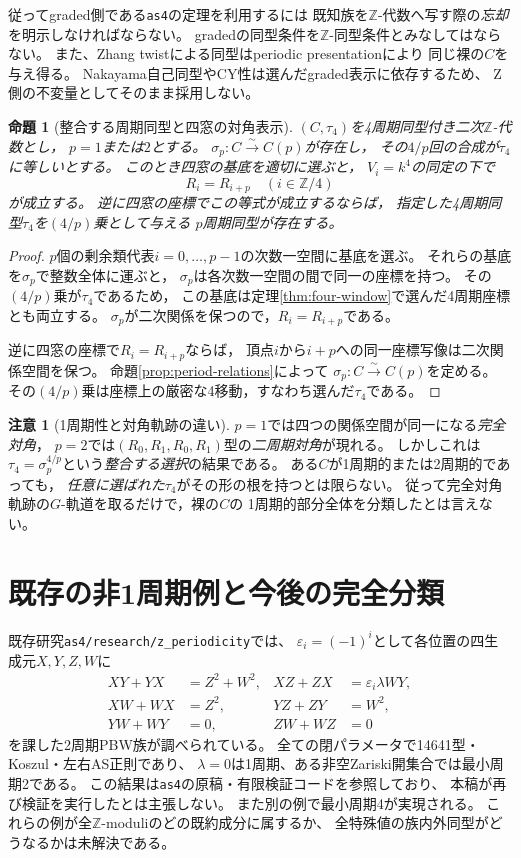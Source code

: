 \documentclass[11pt,a4paper]{ltjsarticle}
\newtheorem{proposition}[theorem]{命題}
\theoremstyle{definition}
\newtheorem{remark}[theorem]{注意}
\newcommand{\ZZ}{\mathbb Z}
\begin{document}
従ってgraded側である\texttt{as4}の定理を利用するには
既知族を$\ZZ$-代数へ写す際の\emph{忘却}を明示しなければならない。
gradedの同型条件を$\ZZ$-同型条件とみなしてはならない。
また、Zhang twistによる同型はperiodic presentationにより
同じ裸の$C$を与え得る。
Nakayama自己同型やCY性は選んだgraded表示に依存するため、
Z側の不変量としてそのまま採用しない。

\begin{proposition}[整合する周期同型と四窓の対角表示]\label{prop:compatible-periodic-windows}
$(C,\tau_4)$を4周期同型付き二次$\mathbb Z$-代数とし，
$p=1$または$2$とする。
$\sigma_p:C\xrightarrow{\sim}C(p)$が存在し，
その$4/p$回の合成が$\tau_4$に等しいとする。
このとき四窓の基底を適切に選ぶと，
$V_i=k^4$の同定の下で
\[
 R_i=R_{i+p}\quad(i\in\mathbb Z/4)
\]
が成立する。
逆に四窓の座標でこの等式が成立するならば，
指定した4周期同型$\tau_4$を$(4/p)$乗として与える
$p$周期同型が存在する。
\end{proposition}
\begin{proof}
$p$個の剰余類代表$i=0,\dots,p-1$の次数一空間に基底を選ぶ。
それらの基底を$\sigma_p$で整数全体に運ぶと，
$\sigma_p$は各次数一空間の間で同一の座標を持つ。
その$(4/p)$乗が$\tau_4$であるため，
この基底は定理\ref{thm:four-window}で選んだ4周期座標とも両立する。
$\sigma_p$が二次関係を保つので，$R_i=R_{i+p}$である。

逆に四窓の座標で$R_i=R_{i+p}$ならば，
頂点$i$から$i+p$への同一座標写像は二次関係空間を保つ。
命題\ref{prop:period-relations}によって
$\sigma_p:C\xrightarrow{\sim}C(p)$を定める。
その$(4/p)$乗は座標上の厳密な4移動，すなわち選んだ$\tau_4$である。
\end{proof}

\begin{remark}[1周期性と対角軌跡の違い]
$p=1$では四つの関係空間が同一になる\emph{完全対角}，
$p=2$では$(R_0,R_1,R_0,R_1)$型の\emph{二周期対角}が現れる。
しかしこれは$\tau_4=\sigma_p^{4/p}$という\emph{整合する選択}の結果である。
ある$C$が1周期的または2周期的であっても，
\emph{任意に選ばれた}$\tau_4$がその形の根を持つとは限らない。
従って完全対角軌跡の$G$-軌道を取るだけで，裸の$C$の
1周期的部分全体を分類したとは言えない。
\end{remark}

\section{既存の非1周期例と今後の完全分類}
既存研究\texttt{as4/research/z\_periodicity}では、
$\varepsilon_i=(-1)^i$として各位置の四生成元$X,Y,Z,W$に
\begin{align*}
 XY+YX&=Z^2+W^2,& XZ+ZX&=\varepsilon_i\lambda WY,\\
 XW+WX&=Z^2,&YZ+ZY&=W^2,\\
 YW+WY&=0,&ZW+WZ&=0
\end{align*}
を課した2周期PBW族が調べられている。
全ての閉パラメータで14641型・Koszul・左右AS正則であり、
$\lambda=0$は1周期、ある非空Zariski開集合では最小周期2である。
この結果は\texttt{as4}の原稿・有限検証コードを参照しており、
本稿が再び検証を実行したとは主張しない。
また別の例で最小周期4が実現される。
これらの例が全$\ZZ$-moduliのどの既約成分に属するか、
全特殊値の族内外同型がどうなるかは未解決である。
\end{document}
